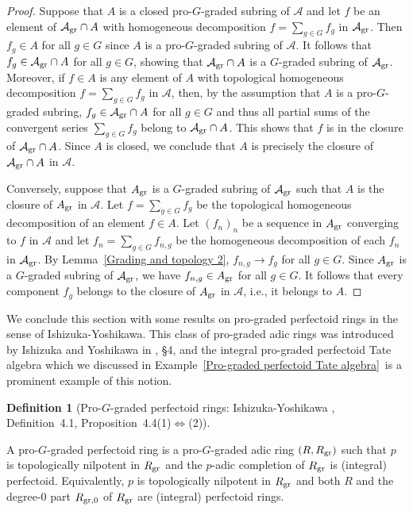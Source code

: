 \documentclass[12pt,twoside,a4paper]{article}
\theoremstyle{definition}
\newtheorem{mydef}[thm]{Definition}
\theoremstyle{remark}
\newcommand\gr{{\rm gr}}
\begin{document}
\begin{proof}Suppose that $A$ is a closed pro-$G$-graded subring of $\mathcal{A}$ and let $f$ be an element of $\mathcal{A}_{\gr}\cap A$ with homogeneous decomposition $f=\sum_{g\in G}f_{g}$ in $\mathcal{A}_{\gr}$. Then $f_{g}\in A$ for all $g\in G$ since $A$ is a pro-$G$-graded subring of $\mathcal{A}$. It follows that $f_{g}\in\mathcal{A}_{\gr}\cap A$ for all $g\in G$, showing that $\mathcal{A}_{\gr}\cap A$ is a $G$-graded subring of $\mathcal{A}_{\gr}$. Moreover, if $f\in A$ is any element of $A$ with topological homogeneous decomposition $f=\sum_{g\in G}f_{g}$ in $\mathcal{A}$, then, by the assumption that $A$ is a pro-$G$-graded subring, $f_{g}\in \mathcal{A}_{\gr}\cap A$ for all $g\in G$ and thus all partial sums of the convergent series $\sum_{g\in G}f_{g}$ belong to $\mathcal{A}_{\gr}\cap A$. This shows that $f$ is in the closure of $\mathcal{A}_{\gr}\cap A$. Since $A$ is closed, we conclude that $A$ is precisely the closure of $\mathcal{A}_{\gr}\cap A$ in $\mathcal{A}$. 

Conversely, suppose that $A_{\gr}$ is a $G$-graded subring of $\mathcal{A}_{\gr}$ such that $A$ is the closure of $A_{\gr}$ in $\mathcal{A}$. Let $f=\sum_{g\in G}f_{g}$ be the topological homogeneous decomposition of an element $f\in A$. Let $(f_{n})_{n}$ be a sequence in $A_{\gr}$ converging to $f$ in $\mathcal{A}$ and let $f_{n}=\sum_{g\in G}f_{n, g}$ be the homogeneous decomposition of each $f_{n}$ in $\mathcal{A}_{\gr}$. By Lemma~\ref{Grading and topology 2}, $f_{n, g}\to f_{g}$ for all $g\in G$. Since $A_{\gr}$ is a $G$-graded subring of $\mathcal{A}_{\gr}$, we have $f_{n, g}\in A_{\gr}$ for all $g\in G$. It follows that every component $f_{g}$ belongs to the closure of $A_{\gr}$ in $\mathcal{A}$, i.e., it belongs to $A$. \end{proof}
We conclude this section with some results on pro-graded perfectoid rings in the sense of Ishizuka-Yoshikawa. This class of pro-graded adic rings was introduced by Ishizuka and Yoshikawa in \cite{Ishizuka-Yoshikawa25}, \S4, and the integral pro-graded perfectoid Tate algebra which we discussed in Example~\ref{Pro-graded perfectoid Tate algebra} is a prominent example of this notion.
\begin{mydef}[Pro-$G$-graded perfectoid rings: Ishizuka-Yoshikawa \cite{Ishizuka-Yoshikawa25}, Definition~4.1, Proposition~4.4(1)$\Leftrightarrow$(2)]~

A pro-$G$-graded perfectoid ring is a pro-$G$-graded adic ring $(R, R_{\gr})$ such that $p$ is topologically nilpotent in $R_{\gr}$ and the $p$-adic completion of $R_{\gr}$ is (integral) perfectoid. Equivalently, $p$ is topologically nilpotent in $R_{\gr}$ and both $R$ and the degree-$0$ part $R_{\gr, 0}$ of $R_{\gr}$ are (integral) perfectoid rings. \end{mydef}
\end{document}
